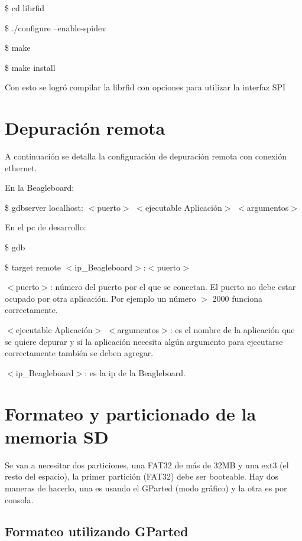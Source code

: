 \bigskip
\centerline{\$ cd librfid}

\centerline{\$ ./configure --enable-spidev}

\centerline{\$ make}

\centerline{\$ make install}

\bigskip
Con esto se logró compilar la librfid con opciones para utilizar la interfaz SPI


\section{Depuración remota}\label{GDB}

A continuación se detalla la configuración de depuración remota con conexión ethernet.

\bigskip
En la Beagleboard:    

\bigskip                							
\centerline{\$ gdbserver localhost: $<$puerto$>$ $<$ejecutable Aplicación$>$ $<$argumentos$>$}

\bigskip
En el pc de desarrollo:

\bigskip
\centerline{\$ gdb}

\centerline{\$ target remote $<$ip\_Beagleboard$>$:$<$puerto$>$}

\bigskip
$<$puerto$>$: número del puerto por el que se conectan. El puerto no debe estar ocupado por otra aplicación. Por ejemplo un número $>$ 2000 funciona correctamente.

\bigskip
$<$ejecutable Aplicación$>$ $<$argumentos$>$: es el nombre de la aplicación que se quiere depurar y si la aplicación necesita algún argumento para ejecutarse correctamente también se deben agregar.

\bigskip
$<$ip\_Beagleboard$>$: es la ip de la Beagleboard.


\section{Formateo y particionado de la memoria SD}

Se van a necesitar dos particiones, una FAT32 de más de 32MB y una ext3 (el resto del espacio), la
primer partición (FAT32) debe ser booteable.
Hay dos maneras de hacerlo, una es usando el GParted (modo gráfico) y la otra es por consola.

\subsection{Formateo utilizando GParted}

